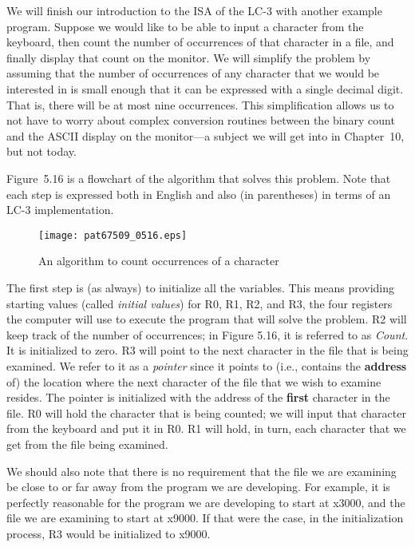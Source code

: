 \documentclass{patt}
\begin{document}
We will finish our introduction to the ISA of the LC-3 with another
example program.  Suppose we would like to be able to input a character from
the keyboard, then count the number of occurrences of that
character in a file, and finally display that count on the monitor.  
We will simplify the problem by assuming that the number
of occurrences of any character that we would be interested in is small
enough that it can be expressed with a single decimal digit.  That is, 
there will be at most nine occurrences.  This simplification allows us to 
not have to worry about complex conversion
routines between the binary count and the ASCII display on the
monitor---a subject we will get into in Chapter~10, but not today.

Figure~5.16 is a flowchart of the algorithm that solves this problem.
Note that each step is expressed both in English and also (in
parentheses) in terms of an LC-3 implementation.

\begin{figure}
\centerline{\texttt{[image: pat67509\_0516.eps]}}
\caption{An algorithm to count occurrences
  of a character}
\label{fig:addalg}
\end{figure}

\FloatBarrier

The first step is (as always) to initialize all the variables.  This
means providing starting values (called {\em initial values}) for R0,
R1, R2, and R3, the four registers the computer will use to execute
the program that will solve the problem. R2 will keep track of the
number of occurrences; in Figure 5.16, it is referred to as {\em Count}.  
It is initialized to zero. R3 will point to the next
character in the file that is being examined.  We refer to it as a 
{\em pointer} since it points to (i.e., contains the {\bf address} of)
the location where
the next character of the file that we wish to examine resides.  The
pointer is initialized with the address of the {\bf first} character
in the file.  R0 will hold the character that is being counted; we
will input that character from the keyboard and put it in R0.  R1 will
hold, in turn, each character that we get from the file being
examined.

We should also note that there is no requirement that the file we are
examining be close to or far away from the program we are developing.
For example, it is perfectly reasonable for the program we are
developing to start at x3000, and the file we are examining to start
at x9000.  If that were the case, in the initialization process, R3
would be initialized to x9000.
\end{document}
